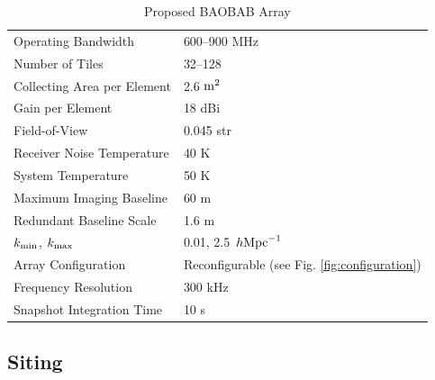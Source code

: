 \documentclass[10pt,iop]{emulateapj}
\begin{document}
\begin{table}[ht]\centering
\caption{Proposed BAOBAB Array}
\begin{tabular}{l|l}
\hline\hline
Operating Bandwidth & 600--900 MHz \\
Number of Tiles & 32--128 \\
Collecting Area per Element & 2.6 $\rm{m}^2$ \\
Gain per Element & 18 dBi \\
Field-of-View & 0.045 str \\
Receiver Noise Temperature & 40 K \\
System Temperature & 50 K\\
Maximum Imaging Baseline & 60 m\\
Redundant Baseline Scale & 1.6 m\\
$k_{\rm min}$, $k_{\rm max}$ & 0.01, 2.5~$h{\rm Mpc}^{-1}$\\ 
Array Configuration & Reconfigurable (see Fig. \ref{fig:configuration})\\
Frequency Resolution & 300 kHz\\
Snapshot Integration Time & 10 s\\
\hline
\end{tabular}
\label{tab:baobab}
\end{table}

\subsection{Siting}
\end{document}
